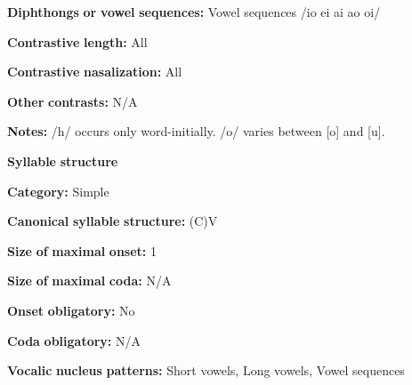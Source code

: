\begin{styleBody}
\textbf{Diphthongs} \textbf{or} \textbf{vowel} \textbf{sequences:} Vowel sequences /io ei ai ao oi/
\end{styleBody}

\begin{styleBody}
\textbf{Contrastive} \textbf{length:} All
\end{styleBody}

\begin{styleBody}
\textbf{Contrastive} \textbf{nasalization:} All
\end{styleBody}

\begin{styleBody}
\textbf{Other} \textbf{contrasts:} N/A
\end{styleBody}

\begin{styleBody}
\textbf{Notes:} /h/ occurs only word-initially. /o/ varies between [o] and [u]. 
\end{styleBody}

\begin{styleBody}
\textbf{Syllable} \textbf{structure}
\end{styleBody}

\begin{styleBody}
\textbf{Category:} Simple
\end{styleBody}

\begin{styleBody}
\textbf{Canonical} \textbf{syllable} \textbf{structure:} (C)V \citep[87-90]{Facundes2000}
\end{styleBody}

\begin{styleBody}
\textbf{Size} \textbf{of} \textbf{maximal} \textbf{onset:} 1
\end{styleBody}

\begin{styleBody}
\textbf{Size} \textbf{of} \textbf{maximal} \textbf{coda:} N/A
\end{styleBody}

\begin{styleBody}
\textbf{Onset} \textbf{obligatory:} No
\end{styleBody}

\begin{styleBody}
\textbf{Coda} \textbf{obligatory:} N/A
\end{styleBody}

\begin{styleBody}
\textbf{Vocalic} \textbf{nucleus} \textbf{patterns:} Short vowels, Long vowels, Vowel sequences
\end{styleBody}


